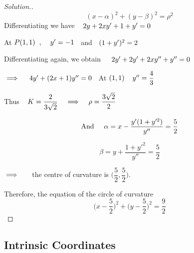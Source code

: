 \documentclass[11pt,a4paper]{article}
\theoremstyle{definition}
\newenvironment{solution}
  {\renewcommand{\qedsymbol}{}\begin{proof}[\textit{Solution}.]}
  {\end{proof}}
\begin{document}
\begin{solution}
$$(x - \alpha)^2 + (y - \beta)^2 = \rho^2$$
Differentiating we have $\hspace{0.3cm}2y + 2xy' + 1 + y' = 0$


At $P(1,1)\hspace{0.2cm} , \hspace{0.4cm} y' = -1\hspace{0.2cm}$ and $\hspace{0.2cm} (1 + y')^2 = 2$


Differentiating again, we obtain $\hspace{0.4cm} 2y' + 2y' + 2xy'' + y'' =0$


$\implies\hspace{0.4cm} 4y' + (2x + 1)y'' = 0\hspace{0.2cm}$ At $(1,1)\hspace{0.4cm} y'' = \dfrac{4}{3}$


Thus $\hspace{0.3cm} K = \dfrac{2}{3\sqrt{2}} \hspace{0.3cm} \implies \hspace{0.3cm} \rho = \dfrac{3\sqrt{2}}{2}$


$$\text{And}\hspace{0.5cm} \alpha = x - \frac{y' (1 + y'^2)}{y''}= \frac{5}{2}$$

$$\beta = y + \frac{1 + y'^2}{y''} = \frac{5}{2}$$

$\implies\hspace{0.5cm} $ the centre of curvature is $\Big(\dfrac{5}{2},\dfrac{5}{2}\Big)$.


Therefore, the equation of the circle of curvature $$ \Big( x - \frac{5}{2}\Big)^2 + \Big(y - \frac{5}{2}\Big)^2 = \frac{9}{2}$$
\end{solution}


\subsection{Intrinsic Coordinates}


\begin{figure}[H]
\centering
{}
\end{figure}
\end{document}
